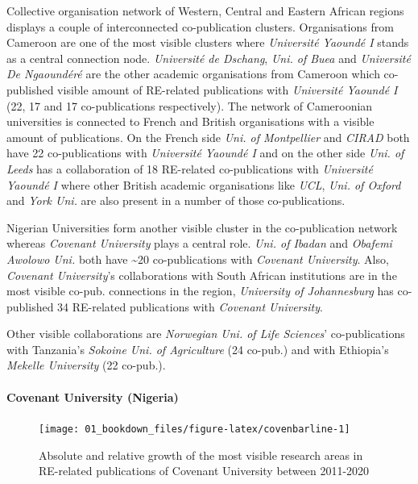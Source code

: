 \documentclass[
]{book}
\begin{document}
Collective organisation network of Western, Central and Eastern African regions displays a couple of interconnected co-publication clusters. Organisations from Cameroon are one of the most visible clusters where \emph{Université Yaoundé I} stands as a central connection node. \emph{Université de Dschang}, \emph{Uni. of Buea} and \emph{Université De Ngaoundéré} are the other academic organisations from Cameroon which co-published visible amount of RE-related publications with \emph{Université Yaoundé I} (22, 17 and 17 co-publications respectively). The network of Cameroonian universities is connected to French and British organisations with a visible amount of publications. On the French side \emph{Uni. of Montpellier} and \emph{CIRAD} both have 22 co-publications with \emph{Université Yaoundé I} and on the other side \emph{Uni. of Leeds} has a collaboration of 18 RE-related co-publications with \emph{Université Yaoundé I} where other British academic organisations like \emph{UCL}, \emph{Uni. of Oxford} and \emph{York Uni.} are also present in a number of those co-publications.

Nigerian Universities form another visible cluster in the co-publication network whereas \emph{Covenant University} plays a central role. \emph{Uni. of Ibadan} and \emph{Obafemi Awolowo Uni.} both have \textasciitilde20 co-publications with \emph{Covenant University}. Also, \emph{Covenant University}'s collaborations with South African institutions are in the most visible co-pub. connections in the region, \emph{University of Johannesburg} has co-published 34 RE-related publications with \emph{Covenant University}.

Other visible collaborations are \emph{Norwegian Uni. of Life Sciences}' co-publications with Tanzania's \emph{Sokoine Uni. of Agriculture} (24 co-pub.) and with Ethiopia's \emph{Mekelle University} (22 co-pub.).

\hypertarget{covenant-university-nigeria}{%
\paragraph{Covenant University (Nigeria)}\label{covenant-university-nigeria}}

\begin{figure}
\texttt{[image: 01\_bookdown\_files/figure-latex/covenbarline-1]} \caption{Absolute and relative growth of the most visible research areas in RE-related publications of Covenant University between 2011-2020}\label{fig:covenbarline}
\end{figure}
\end{document}
